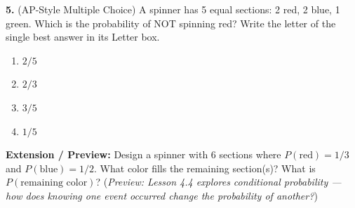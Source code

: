 \documentclass[10pt]{article}
\begin{document}
\begin{practicebox}
\vspace{8pt}
\textbf{5.} (AP-Style Multiple Choice) A spinner has 5 equal sections: 2 red,
2 blue, 1 green. Which is the probability of NOT spinning red?
Write the letter of the single best answer in its Letter box.

\begin{enumerate}[label=(\Alph*), leftmargin=2em, itemsep=4pt]
  \item $2/5$
  \item $2/3$
  \item $3/5$
  \item $1/5$
        \hfill{}\rule[-14pt]{0pt}{32pt}
\end{enumerate}

\vspace{8pt}
\textbf{Extension / Preview:} Design a spinner with 6 sections where
$P(\text{red}) = 1/3$ and $P(\text{blue}) = 1/2$. What color fills the remaining
section(s)? What is $P(\text{remaining color})$? (\textit{Preview: Lesson 4.4 explores
conditional probability --- how does knowing one event occurred change the probability
of another?})

\end{practicebox}
\end{document}

